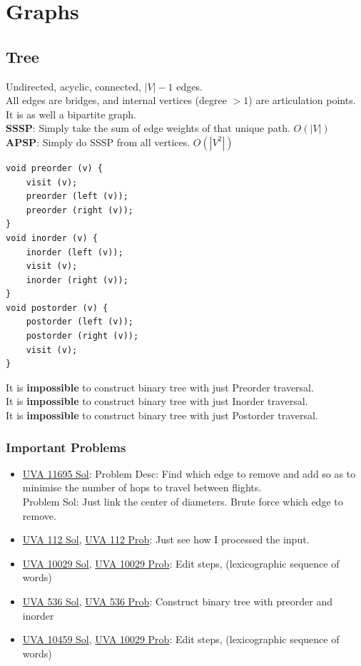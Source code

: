 \documentclass[8pt, a4paper, oneside, twocolumn]{extarticle}
\begin{document}
\section{Graphs}
\subsection{Tree}
Undirected, acyclic, connected, $|V| - 1$ edges.\\
All edges are bridges, and internal vertices (degree $> 1$) are articulation points.\\
It is as well a bipartite graph.\\
\textbf{SSSP}: Simply take the sum of edge weights of that unique path. $O(|V|)$\\
\textbf{APSP}: Simply do SSSP from all vertices. $O(|V^2|)$
\begin{verbatim}
void preorder (v) {
	visit (v);
	preorder (left (v));
	preorder (right (v));
}
void inorder (v) {
	inorder (left (v));
	visit (v);
	inorder (right (v));
}
void postorder (v) {
	postorder (left (v));
	postorder (right (v));
	visit (v);
}
\end{verbatim}
It is \textbf {impossible} to construct binary tree with just Preorder traversal.\\ 
It is \textbf {impossible} to construct binary tree with just Inorder traversal.\\
It is \textbf {impossible} to construct binary tree with just Postorder traversal.
\subsubsection{Important Problems}
\begin{itemize}
	\item \href {https://gist.github.com/sourabh2311/6cff69fef833097556696bd6f31f3f1d}{UVA 11695 Sol}: Problem Desc: Find which edge to remove and add so as to minimise the number of hops to travel between flights.\\
	Problem Sol: Just link the center of diameters. Brute force which edge to remove. 
	\item \href {https://github.com/sourabh2311/Competitive-Programming/blob/master/UVA_112.cpp}{UVA 112 Sol}, \href {https://uva.onlinejudge.org/external/1/112.pdf}{UVA 112 Prob}: Just see how I processed the input.	
	\item \href {https://gist.github.com/sourabh2311/6b761c14bef4e5887e6b03b809bc4983}{UVA 10029 Sol}, \href {https://uva.onlinejudge.org/external/100/10029.pdf}{UVA 10029 Prob}: Edit steps, (lexicographic sequence of words)	
	\item \href {https://gist.github.com/sourabh2311/d73572fab5cf6d390f509d29abf4cd60}{UVA 536 Sol}, \href {https://uva.onlinejudge.org/external/5/536.pdf}{UVA 536 Prob}: Construct binary tree with preorder and inorder	
	\item \href {https://gist.github.com/sourabh2311/25edb7a7067948832ade9192bd2635ce}{UVA 10459 Sol}, \href {https://uva.onlinejudge.org/external/104/10459.pdf}{UVA 10029 Prob}: Edit steps, (lexicographic sequence of words)	
\end{itemize}
\end{document}
